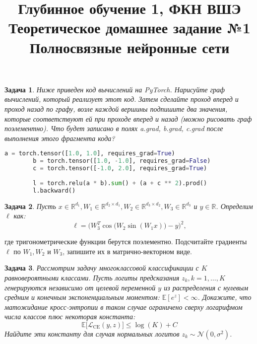 \documentclass[12pt,fleqn]{article}
\title{Глубинное обучение 1, ФКН ВШЭ\\Теоретическое домашнее задание №1\\Полносвязные нейронные сети}
\author{}
\date{}
\newtheorem{esProblem}{Задача}
\begin{document}
\maketitle

\begin{esProblem}
    Ниже приведен код вычислений на PyTorch. Нарисуйте граф вычислений, который реализует этот код. Затем сделайте проход вперед и проход назад по графу, возле каждой вершины подпишите два значения, которые соответствуют ей при проходе вперед и назад (можно рисовать граф поэлементно). Что будет записано в полях a.grad, b.grad, c.grad после выполнения этого фрагмента кода?
    \begin{center}
        \begin{lstlisting}[language=Python]
        a = torch.tensor([1.0, 1.0], requires_grad=True)
        b = torch.tensor([1.0, -1.0], requires_grad=False)
        c = torch.tensor([-1.0, 2.0], requires_grad=True)
            
        l = torch.relu(a * b).sum() + (a + c ** 2).prod()
        l.backward()
        \end{lstlisting}
    \end{center}
\end{esProblem}
\vspace{-1.5\baselineskip}

\begin{esProblem}
    Пусть $x \in \mathbb{R}^{d_1}, W_1 \in \mathbb{R}^{d_2 \times d_1}, W_2 \in \mathbb{R}^{d_3 \times d_2}, W_3 \in \mathbb{R}^{d_3}$ и $y \in \mathbb{R}$. Определим $\ell$ как:
    $$
    \ell = \Big(W_3^T \cos \big(W_2 \sin(W_1 x) \big) - y\Big)^2,
    $$
\end{esProblem}

\noindent
где тригонометрические функции берутся поэлементно. Подсчитайте градиенты $\ell$ по $W_1, W_2$ и $W_3$, запишите их в матрично-векторном виде.

\begin{esProblem}
    Рассмотрим задачу многоклассовой классификации с $K$ равновероятными классами. Пусть логиты предсказания $z_k, k = 1, \dots, K$ генерируются независимо от целевой переменной $y$ из распределения с нулевым средним и конечным экспоненциальным моментом: $\mathbb{E} [e^{z}] < \infty$. Докажите, что матожидание кросс-энтропии в таком случае ограничено сверху логарифмом числа классов плюс некоторая константа:
    $$
    \mathbb{E} \Big[ \mathcal{L}_{\text{CE}}(y, z) \Big] \le \log(K) + C
    $$
    Найдите эти константу для случая нормальных логитов $z_k \sim \mathcal{N}(0, \sigma^2)$.
\end{esProblem}
\end{document}
